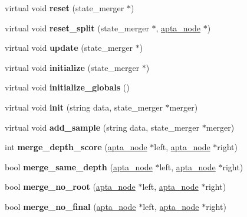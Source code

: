 \begin{DoxyCompactItemize}
\mbox{\label{classevaluation__function_acc457754e1aff5d9e20cf51ea8976f37}} 
virtual void {\bfseries reset} (state\+\_\+merger $\ast$)
\item 
\mbox{\label{classevaluation__function_aa15dab22b819a173150ae6a2fc7008eb}} 
virtual void {\bfseries reset\+\_\+split} (state\+\_\+merger $\ast$, \hyperlink{classapta__node}{apta\+\_\+node} $\ast$)
\item 
\mbox{\label{classevaluation__function_af2c5134a769ccfd8703608b16a4ede06}} 
virtual void {\bfseries update} (state\+\_\+merger $\ast$)
\item 
\mbox{\label{classevaluation__function_af15dfb9e27651870fbabf8b8355faefc}} 
virtual void {\bfseries initialize} (state\+\_\+merger $\ast$)
\item 
\mbox{\label{classevaluation__function_afb165f959956e28865627fb85b91a50e}} 
virtual void {\bfseries initialize\+\_\+globals} ()
\item 
\mbox{\label{classevaluation__function_aea7c6d5884be03430212d55b3dd546ea}} 
virtual void {\bfseries init} (string data, state\+\_\+merger $\ast$merger)
\item 
\mbox{\label{classevaluation__function_a5b63865df7d337aa0c258b7c795dd6c6}} 
virtual void {\bfseries add\+\_\+sample} (string data, state\+\_\+merger $\ast$merger)
\item 
\mbox{\label{classevaluation__function_aa0126081c2ffc499c4a9b6b87ba7bc22}} 
int {\bfseries merge\+\_\+depth\+\_\+score} (\hyperlink{classapta__node}{apta\+\_\+node} $\ast$left, \hyperlink{classapta__node}{apta\+\_\+node} $\ast$right)
\item 
\mbox{\label{classevaluation__function_a9449a856041bf91766e567ab79499d53}} 
bool {\bfseries merge\+\_\+same\+\_\+depth} (\hyperlink{classapta__node}{apta\+\_\+node} $\ast$left, \hyperlink{classapta__node}{apta\+\_\+node} $\ast$right)
\item 
\mbox{\label{classevaluation__function_acdd6a3e0617d5d4e62b1e78cc8e4b634}} 
bool {\bfseries merge\+\_\+no\+\_\+root} (\hyperlink{classapta__node}{apta\+\_\+node} $\ast$left, \hyperlink{classapta__node}{apta\+\_\+node} $\ast$right)
\item 
\mbox{\label{classevaluation__function_ab52de0430a8a54502d2d53edc62566b1}} 
bool {\bfseries merge\+\_\+no\+\_\+final} (\hyperlink{classapta__node}{apta\+\_\+node} $\ast$left, \hyperlink{classapta__node}{apta\+\_\+node} $\ast$right)
\end{DoxyCompactItemize}
